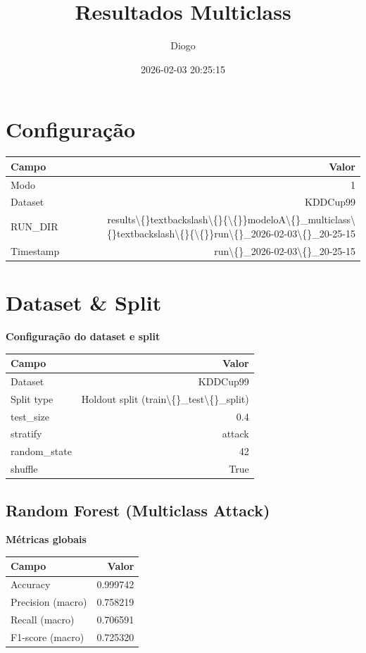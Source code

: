 \documentclass[11pt]{article}
\title{Resultados Multiclass}
\author{Diogo}
\date{2026-02-03 20:25:15}
\begin{document}
\maketitle

\section*{Configuração}
\begin{tabular}{lr}
\toprule
Campo & Valor \\
\midrule
Modo & 1 \\
Dataset & KDDCup99 \\
RUN\_DIR & results\textbackslash\{\}textbackslash\textbackslash\{\}\{\textbackslash\{\}\}modeloA\textbackslash\{\}\_multiclass\textbackslash\{\}textbackslash\textbackslash\{\}\{\textbackslash\{\}\}run\textbackslash\{\}\_2026-02-03\textbackslash\{\}\_20-25-15 \\
Timestamp & run\textbackslash\{\}\_2026-02-03\textbackslash\{\}\_20-25-15 \\
\bottomrule
\end{tabular}

\section*{Dataset \& Split}
\begin{center}
\textbf{Configuração do dataset e split}\par
\begin{tabular}{lr}
\toprule
Campo & Valor \\
\midrule
Dataset & KDDCup99 \\
Split type & Holdout split (train\textbackslash\{\}\_test\textbackslash\{\}\_split) \\
test\_size & 0.4 \\
stratify & attack \\
random\_state & 42 \\
shuffle & True \\
\bottomrule
\end{tabular}
\end{center}

\subsection*{Random Forest (Multiclass Attack)}
\begin{center}
\textbf{Métricas globais}\par
\begin{tabular}{lr}
\toprule
Campo & Valor \\
\midrule
Accuracy & 0.999742 \\
Precision (macro) & 0.758219 \\
Recall (macro) & 0.706591 \\
F1-score (macro) & 0.725320 \\
\bottomrule
\end{tabular}
\end{center}
\end{document}

